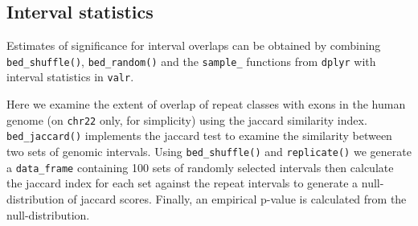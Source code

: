 \documentclass[9pt,a4paper]{extarticle}
\begin{document}
\subsection*{Interval statistics}\label{interval-statistics}

Estimates of significance for interval overlaps can be obtained by
combining \texttt{bed\_shuffle()}, \texttt{bed\_random()} and the
\texttt{sample\_} functions from \texttt{dplyr} with interval statistics
in \texttt{valr}.

Here we examine the extent of overlap of repeat classes with exons in
the human genome (on \texttt{chr22} only, for simplicity) using the
jaccard similarity index. \texttt{bed\_jaccard()} implements the jaccard
test to examine the similarity between two sets of genomic intervals.
Using \texttt{bed\_shuffle()} and \texttt{replicate()} we generate a
\texttt{data\_frame} containing 100 sets of randomly selected intervals
then calculate the jaccard index for each set against the repeat intervals
to generate a null-distribution of jaccard scores. Finally, an empirical p-value is
calculated from the null-distribution.
\end{document}
